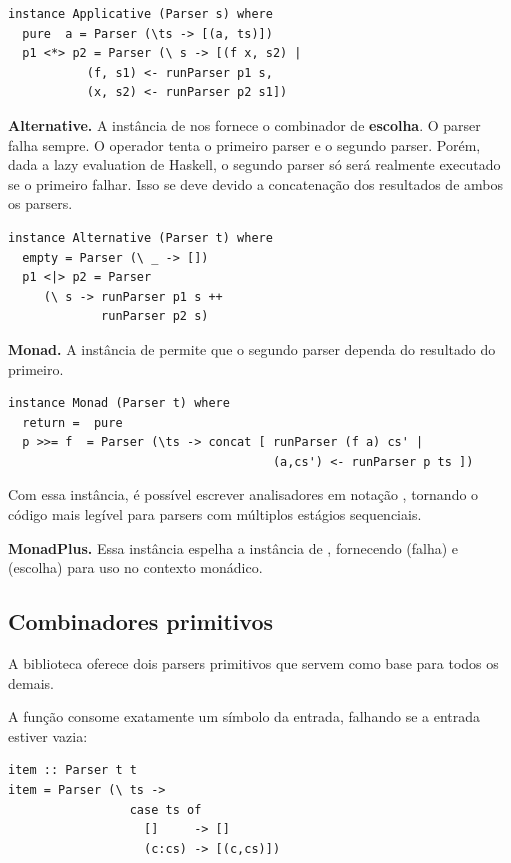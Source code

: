 \begin{verbatim}
instance Applicative (Parser s) where
  pure  a = Parser (\ts -> [(a, ts)])
  p1 <*> p2 = Parser (\ s -> [(f x, s2) |
           (f, s1) <- runParser p1 s,
           (x, s2) <- runParser p2 s1])
\end{verbatim}

\textbf{Alternative.} A instância de
 nos fornece o combinador de
\textbf{escolha}. O parser  falha
sempre. O operador \haskell{<|>} tenta o primeiro
parser e o segundo parser. Porém, dada a lazy evaluation de Haskell,
o segundo parser só será realmente executado se o primeiro falhar.
Isso se deve devido a concatenação dos resultados de ambos os parsers.

\begin{verbatim}
instance Alternative (Parser t) where
  empty = Parser (\ _ -> [])
  p1 <|> p2 = Parser
     (\ s -> runParser p1 s ++
             runParser p2 s)
\end{verbatim}

\textbf{Monad.} A instância de 
permite que o segundo parser dependa do resultado do primeiro.

\begin{verbatim}
instance Monad (Parser t) where
  return =  pure
  p >>= f  = Parser (\ts -> concat [ runParser (f a) cs' |
                                     (a,cs') <- runParser p ts ])
\end{verbatim}

Com essa instância, é possível escrever analisadores em notação
, tornando o código mais legível para
parsers com múltiplos estágios sequenciais.

\textbf{MonadPlus.} Essa instância espelha a instância de
, fornecendo
 (falha) e
 (escolha) para uso no contexto monádico.

\subsection{Combinadores primitivos}

A biblioteca oferece dois parsers primitivos que servem como base
para todos os demais.

A função  consome exatamente um símbolo
da entrada, falhando se a entrada estiver vazia:

\begin{verbatim}
item :: Parser t t
item = Parser (\ ts ->
                 case ts of
                   []     -> []
                   (c:cs) -> [(c,cs)])
\end{verbatim}

